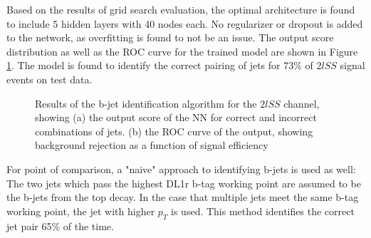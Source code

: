 
Based on the results of grid search evaluation, the optimal architecture is found to include 5 hidden layers with 40 nodes each. No regularizer or dropout is added to the network, as overfitting is found to not be an issue. The output score distribution as well as the ROC curve for the trained model are shown in Figure \ref{fig:top2lSSresults}. The model is found to identify the correct pairing of jets for 73\% of $2lSS$ signal events on test data.

\begin{figure}[H]
  \centering
  \label{fig:top2lSSresults}
  \caption{Results of the b-jet identification algorithm for the $2lSS$ channel, showing (a) the output score of the NN for correct and incorrect combinations of jets. (b) the ROC curve of the output, showing background rejection as a function of signal efficiency}
\end{figure}

For point of comparison, a "naive" approach to identifying b-jets is used as well: The two jets which pass the highest DL1r b-tag working point are assumed to be the b-jets from the top decay. In the case that multiple jets meet the same b-tag working point, the jet with higher $p_T$ is used. This method identifies the correct jet pair 65\% of the time. 

